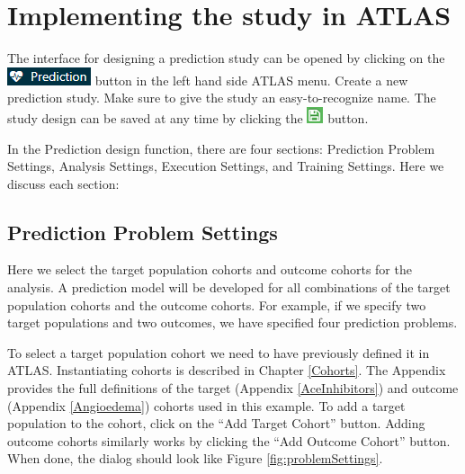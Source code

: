 \documentclass[11pt]{book}
\theoremstyle{definition}
\theoremstyle{definition}
\theoremstyle{definition}
\theoremstyle{remark}
\begin{document}
\hypertarget{implementing-the-study-in-atlas}{%
\section{Implementing the study in ATLAS}\label{implementing-the-study-in-atlas}}

The interface for designing a prediction study can be opened by clicking on the \includegraphics{images/PatientLevelPrediction/predictionButton.png} button in the left hand side ATLAS menu. Create a new prediction study. Make sure to give the study an easy-to-recognize name. The study design can be saved at any time by clicking the \includegraphics{images/PopulationLevelEstimation/save.png} button. 

In the Prediction design function, there are four sections: Prediction Problem Settings, Analysis Settings, Execution Settings, and Training Settings. Here we discuss each section:

\hypertarget{prediction-problem-settings}{%
\subsection{Prediction Problem Settings}\label{prediction-problem-settings}}

Here we select the target population cohorts and outcome cohorts for the analysis. A prediction model will be developed for all combinations of the target population cohorts and the outcome cohorts. For example, if we specify two target populations and two outcomes, we have specified four prediction problems.

To select a target population cohort we need to have previously defined it in ATLAS. Instantiating cohorts is described in Chapter \ref{Cohorts}. The Appendix provides the full definitions of the target (Appendix \ref{AceInhibitors}) and outcome (Appendix \ref{Angioedema}) cohorts used in this example. To add a target population to the cohort, click on the ``Add Target Cohort'' button. Adding outcome cohorts similarly works by clicking the ``Add Outcome Cohort'' button. When done, the dialog should look like Figure \ref{fig:problemSettings}.
\end{document}
